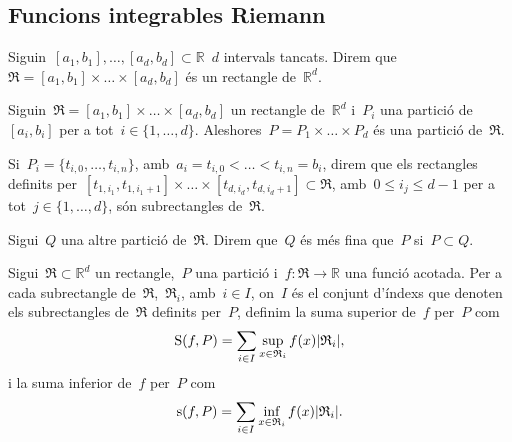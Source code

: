 \documentclass[../../main.tex]{subfiles}
\begin{document}
    \subsection{Funcions integrables Riemann}
    \begin{definition}[Rectangle]
        \label{def:Rectangle}
        Siguin~\([a_{1},b_{1}],\dots,[a_{d},b_{d}]\subset\mathbb{R}\)~\(d\) intervals tancats.
        Direm que~\(\mathfrak{R}=[a_{1},b_{1}]\times\dots\times[a_{d},b_{d}]\) és un rectangle de~\(\mathbb{R}^{d}\).
    \end{definition}
    \begin{definition}
        \label{def:Partició d'un rectangle}
        \label{def:finor d'una partició}
        Siguin~\(\mathfrak{R}=[a_{1},b_{1}]\times\dots\times[a_{d},b_{d}]\) un rectangle de~\(\mathbb{R}^{d}\) i~\(P_{i}\) una partició de~\([a_{i},b_{i}]\) per a tot~\(i\in\{1,\dots,d\}\).
        Aleshores~\(P=P_{1}\times\dots\times P_{d}\) és una partició de~\(\mathfrak{R}\).

        Si~\(P_{i}=\{t_{i,0},\dots,t_{i,n}\}\), amb~\(a_{i}=t_{i,0}<\dots<t_{i,n}=b_{i}\), direm que els rectangles definits per~\([t_{1,i_{1}},t_{1,i_{1}+1}]\times\dots\times[t_{d,i_{d}},t_{d,i_{d}+1}]\subset \mathfrak{R}\), amb~\(0\leq i_{j}\leq d-1\) per a tot~\(j\in\{1,\dots,d\}\), són subrectangles de~\(\mathfrak{R}\).

        Sigui~\(Q\) una altre partició de~\(\mathfrak{R}\).
        Direm que~\(Q\) és més fina que~\(P\) si~\(P\subset Q\).
    \end{definition}
    \begin{definition}
        \label{def:Suma superior i inferior}
        Sigui~\(\mathfrak{R}\subset\mathbb{R}^{d}\) un rectangle,~\(P\) una partició i~\(f\colon\mathfrak{R}\to\mathbb{R}\) una funció acotada.
        Per a cada subrectangle de~\(\mathfrak{R}\),~\(\mathfrak{R}_{i}\), amb~\(i\in I\), on~\(I\) és el conjunt d'índexs que denoten els subrectangles de~\(\mathfrak{R}\) definits per~\(P\), definim la suma superior de~\(f\) per~\(P\) com
        \[
            \Ssup(f,P)=\sum_{i\in I}\sup_{x\in \mathfrak{R}_{i}}f(x)\abs{\mathfrak{R}_{i}},
        \]
        i la suma inferior de~\(f\) per~\(P\) com
        \[
            \sinf(f,P)=\sum_{i\in I}\inf_{x\in \mathfrak{R}_{i}}f(x)\abs{\mathfrak{R}_{i}}.
        \]
    \end{definition}
\end{document}

